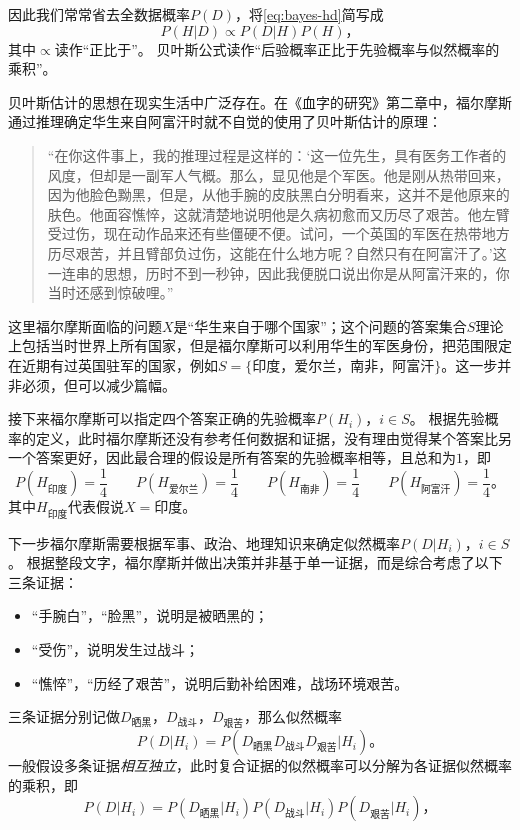 因此我们常常省去全数据概率$P(D)$，将\cref{eq:bayes-hd}简写成
\begin{equation}\label{eq:bayes-propto}
    P(H|D)\propto P(D|H)P(H)，
\end{equation}
其中$\propto$读作“正比于”。
贝叶斯公式读作“后验概率正比于先验概率与似然概率的乘积”。

贝叶斯估计的思想在现实生活中广泛存在。在《血字的研究》第二章中，福尔摩斯通过推理确定华生来自阿富汗时就不自觉的使用了贝叶斯估计的原理：
\begin{quotation}
    “在你这件事上，我的推理过程是这样的：‘这一位先生，具有医务工作者的风度，但却是一副军人气概。那么，显见他是个军医。他是刚从热带回来，因为他脸色黝黑，但是，从他手腕的皮肤黑白分明看来，这并不是他原来的肤色。他面容憔悴，这就清楚地说明他是久病初愈而又历尽了艰苦。他左臂受过伤，现在动作品来还有些僵硬不便。试问，一个英国的军医在热带地方历尽艰苦，并且臂部负过伤，这能在什么地方呢？自然只有在阿富汗了。’这一连串的思想，历时不到一秒钟，因此我便脱口说出你是从阿富汗来的，你当时还感到惊破哩。”
\end{quotation}

这里福尔摩斯面临的问题$X$是“华生来自于哪个国家”；这个问题的答案集合$S$理论上包括当时世界上所有国家，但是福尔摩斯可以利用华生的军医身份，把范围限定在近期有过英国驻军的国家，例如$S=\{印度，爱尔兰，南非，阿富汗\}$。这一步并非必须，但可以减少篇幅。

接下来福尔摩斯可以指定四个答案正确的先验概率$P(H_i)，i\in S$。
根据先验概率的定义，此时福尔摩斯还没有参考任何数据和证据，没有理由觉得某个答案比另一个答案更好，因此最合理的假设是所有答案的先验概率相等，且总和为$1$，即
\begin{equation*}
    P(H_{印度})=\frac{1}{4}\qquad P(H_{爱尔兰})=\frac{1}{4}\qquad P(H_{南非})=\frac{1}{4}\qquad P(H_{阿富汗})=\frac{1}{4}。
\end{equation*}
其中$H_{印度}$代表假说$X=印度$。

下一步福尔摩斯需要根据军事、政治、地理知识来确定似然概率$P(D|H_i)，i\in S$。
根据整段文字，福尔摩斯并做出决策并非基于单一证据，而是综合考虑了以下三条证据：
\begin{itemize}
    \item “手腕白”，“脸黑”，说明是被晒黑的；
    \item “受伤”，说明发生过战斗；
    \item “憔悴”，“历经了艰苦”，说明后勤补给困难，战场环境艰苦。
\end{itemize}
三条证据分别记做$D_{晒黑}$，$D_{战斗}$，$D_{艰苦}$，那么似然概率
\begin{equation*}
    P(D|H_i)=P(D_{晒黑}D_{战斗}D_{艰苦}|H_i)。
\end{equation*}
一般假设多条证据\emph{相互独立}，此时复合证据的似然概率可以分解为各证据似然概率的乘积，即
\begin{equation}
    P(D|H_i)=P(D_{晒黑}|H_i)P(D_{战斗}|H_i)P(D_{艰苦}|H_i)，
\end{equation}

